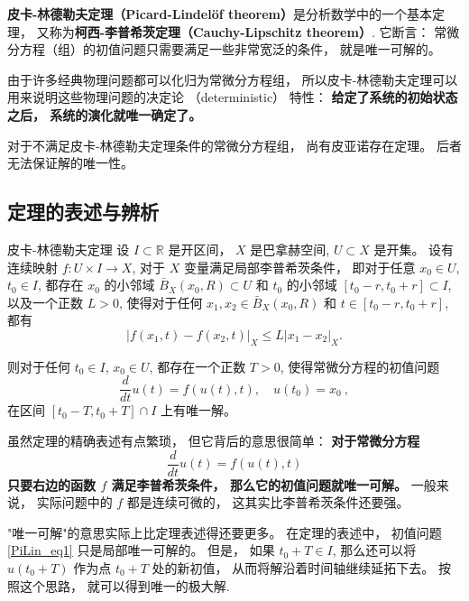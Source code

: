 
\textbf{皮卡-林德勒夫定理（Picard-Lindelöf theorem）}是分析数学中的一个基本定理， 又称为\textbf{柯西-李普希茨定理（Cauchy-Lipschitz theorem）}. 它断言： 常微分方程（组）的初值问题只需要满足一些非常宽泛的条件， 就是唯一可解的。 

由于许多经典物理问题都可以化归为常微分方程组， 所以皮卡-林德勒夫定理可以用来说明这些物理问题的决定论 （deterministic） 特性： \textbf{给定了系统的初始状态之后， 系统的演化就唯一确定了。}

对于不满足皮卡-林德勒夫定理条件的常微分方程组， 尚有皮亚诺存在定理。 后者无法保证解的唯一性。

\subsection{定理的表述与辨析}
\begin{theorem}{皮卡-林德勒夫定理}
设 $I\subset\mathbb{R}$ 是开区间， $X$ 是巴拿赫空间, $U\subset X$ 是开集。 设有连续映射 $f:U\times I\to X$, 对于 $X$ 变量满足局部李普希茨条件， 即对于任意 $x_0\in U$, $t_0\in I$, 都存在 $x_0$ 的小邻域 $\bar B_X(x_0,R)\subset U$ 和 $t_0$ 的小邻域 $[t_0-r,t_0+r]\subset I$, 以及一个正数 $L>0$, 使得对于任何 $x_1,x_2\in \bar B_X(x_0,R)$ 和 $t\in[t_0-r,t_0+r]$, 都有
$$
|f(x_1,t)-f(x_2,t)|_X\leq L|x_1-x_2|_X.
$$

则对于任何 $t_0\in I$, $x_0\in U$, 都存在一个正数 $T>0$, 使得常微分方程的初值问题
$$
\frac{d}{dt}u(t)=f(u(t),t),\quad u(t_0)=x_0~,
$$
在区间 $[t_0-T,t_0+T]\cap I$ 上有唯一解。
\end{theorem}

虽然定理的精确表述有点繁琐， 但它背后的意思很简单： \textbf{对于常微分方程}
\begin{equation}\label{PiLin_eq1}
\frac{d}{dt}u(t)=f(u(t),t)
\end{equation}
\textbf{只要右边的函数 $f$ 满足李普希茨条件， 那么它的初值问题就唯一可解。} 一般来说， 实际问题中的 $f$ 都是连续可微的， 这其实比李普希茨条件还要强。

"唯一可解"的意思实际上比定理表述得还要更多。 在定理的表述中， 初值问题 \autoref{PiLin_eq1} 只是局部唯一可解的。 但是， 如果 $t_0+T\in I$, 那么还可以将 $u(t_0+T)$ 作为点 $t_0+T$ 处的新初值， 从而将解沿着时间轴继续延拓下去。 按照这个思路， 就可以得到唯一的极大解.

